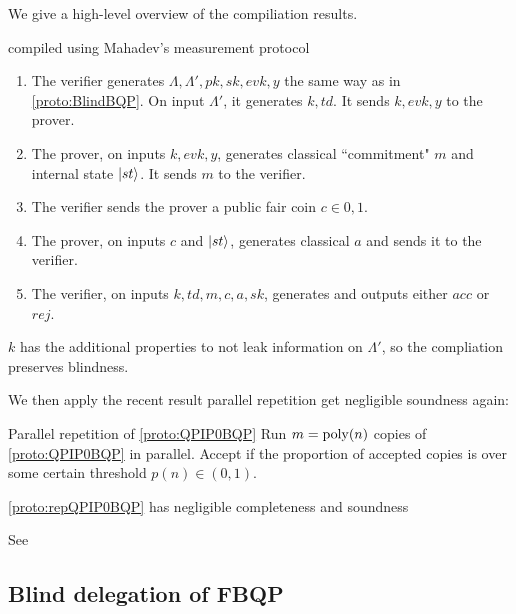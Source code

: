 We give a high-level overview of the compiliation results.

\begin{protocol}{ compiled using Mahadev's measurement protocol }
	\label{proto:QPIP0BQP}
	\begin{enumerate}
		\item The verifier generates $\Lambda, \Lambda', pk, sk, evk, y$ the same way as in \cref{proto:BlindBQP}. 
			On input $\Lambda'$, it generates $k, td$.
			It sends $k, evk, y$ to the prover.
		\item The prover, on inputs $k, evk, y$, generates classical ``commitment" $m$ and internal state $\ket{st}$.
			It sends $m$ to the verifier.
		\item The verifier sends the prover a public fair coin $c\in{0,1}$.
		\item The prover, on inputs $c$ and $\ket{st}$, generates classical $a$ and sends it to the verifier.
		\item The verifier, on inputs $k, td, m, c, a, sk$, generates and outputs either $acc$ or $rej$.
	\end{enumerate}
\end{protocol}

$k$ has the additional properties to not leak information on $\Lambda'$, so the compliation preserves blindness. 

We then apply the recent result parallel repetition get negligible soundness again:

\begin{protocol}{Parallel repetition of \cref{proto:QPIP0BQP}}
	\label{proto:repQPIP0BQP}
	Run $m=\operatorname*{\operatorname{poly}}(n)$ copies of \cref{proto:QPIP0BQP} in parallel. Accept if the proportion of accepted copies is over some certain threshold $p(n)\in(0, 1)$.

\end{protocol}

\begin{thm}
	\cref{proto:repQPIP0BQP} has negligible completeness and soundness
\end{thm}
\begin{prf}
	See \cite{parallelrep} 
\end{prf}

\subsection{Blind delegation of FBQP}

